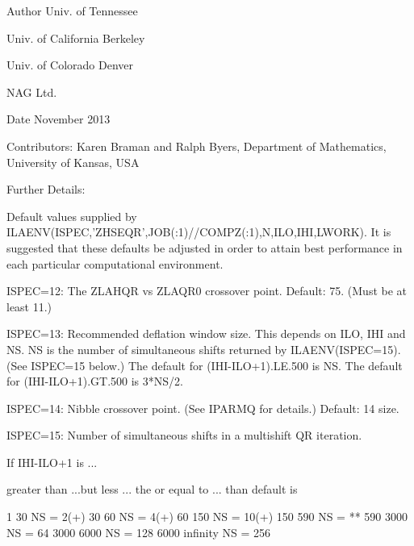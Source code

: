 \begin{DoxyAuthor}{Author}
Univ. of Tennessee 

Univ. of California Berkeley 

Univ. of Colorado Denver 

N\+A\+G Ltd. 
\end{DoxyAuthor}
\begin{DoxyDate}{Date}
November 2013 
\end{DoxyDate}
\begin{DoxyParagraph}{Contributors\+: }
Karen Braman and Ralph Byers, Department of Mathematics, University of Kansas, U\+S\+A 
\end{DoxyParagraph}
\begin{DoxyParagraph}{Further Details\+: }
\begin{DoxyVerb}             Default values supplied by
             ILAENV(ISPEC,'ZHSEQR',JOB(:1)//COMPZ(:1),N,ILO,IHI,LWORK).
             It is suggested that these defaults be adjusted in order
             to attain best performance in each particular
             computational environment.

            ISPEC=12: The ZLAHQR vs ZLAQR0 crossover point.
                      Default: 75. (Must be at least 11.)

            ISPEC=13: Recommended deflation window size.
                      This depends on ILO, IHI and NS.  NS is the
                      number of simultaneous shifts returned
                      by ILAENV(ISPEC=15).  (See ISPEC=15 below.)
                      The default for (IHI-ILO+1).LE.500 is NS.
                      The default for (IHI-ILO+1).GT.500 is 3*NS/2.

            ISPEC=14: Nibble crossover point. (See IPARMQ for
                      details.)  Default: 14%
                      size.

            ISPEC=15: Number of simultaneous shifts in a multishift
                      QR iteration.

                      If IHI-ILO+1 is ...

                      greater than      ...but less    ... the
                      or equal to ...      than        default is

                           1               30          NS =   2(+)
                          30               60          NS =   4(+)
                          60              150          NS =  10(+)
                         150              590          NS =  **
                         590             3000          NS =  64
                        3000             6000          NS = 128
                        6000             infinity      NS = 256


\end{DoxyVerb}
\end{DoxyParagraph}
